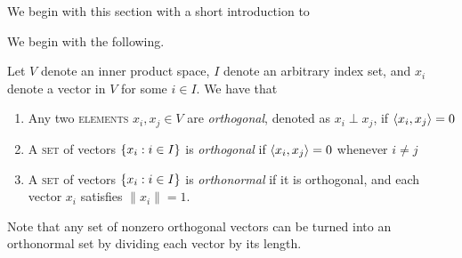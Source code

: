 \documentclass[../thesis.tex]{subfiles}
\begin{document}
%
%


We begin with this section with a short introduction to 

We begin with the following. 

\begin{definition}
    Let $V$ denote an inner product space, $I$ denote an arbitrary index set, and $x_i$ denote a vector in $V$ for some $i \in I$. We have that 
    \begin{enumerate}
        \item Any two \textsc{elements} $x_i, x_j \in V$ are \emph{orthogonal}, denoted as $x_i \perp x_j$, if $\langle x_i,x_j\rangle = 0$
        \item A \textsc{set} of vectors $\{x_i : i \in I\}$ is \emph{orthogonal} if $\langle x_i,x_j\rangle = 0$ whenever $i \neq j$ %
        \item A \textsc{set} of vectors $\{x_i : i \in I\}$ is \emph{orthonormal} if it is orthogonal, and each vector $x_i$ satisfies $\|x_i\| = 1$. %
    \end{enumerate}\qedhere
\end{definition}

\begin{remark}
    Note that any set of nonzero orthogonal vectors can be turned into an orthonormal set by dividing each vector by its length. %
\end{remark}
\end{document}
